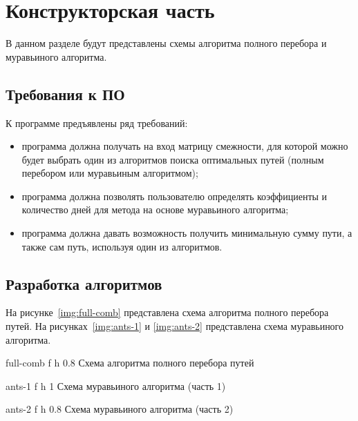 \chapter{Конструкторская часть}

В данном разделе будут представлены схемы алгоритма полного перебора и муравьиного алгоритма.

\section{Требования к ПО}

К программе предъявлены ряд требований:

\begin{itemize}[label=---]
	\item программа должна получать на вход матрицу смежности, для которой можно будет выбрать один из алгоритмов поиска оптимальных путей (полным перебором или муравьиным алгоритмом);
	\item программа должна позволять пользователю определять коэффициенты и количество дней для метода на основе муравьиного алгоритма;
	\item программа должна давать возможность получить минимальную сумму пути, а также сам путь, используя один из алгоритмов.
\end{itemize}

\section{Разработка алгоритмов}

На рисунке~\ref{img:full-comb} представлена схема алгоритма полного перебора путей.
На рисунках~\ref{img:ants-1} и \ref{img:ants-2}  представлена схема муравьиного алгоритма.

{full-comb} %
{f} %
{h} %
{0.8\textwidth} %
{Схема алгоритма полного перебора путей} %

	{ants-1} %
	{f} %
	{h} %
	{1\textwidth} %
	{Схема муравьиного алгоритма (часть 1)} %


	{ants-2} %
	{f} %
	{h} %
	{0.8\textwidth} %
	{Схема муравьиного алгоритма (часть 2)} %


